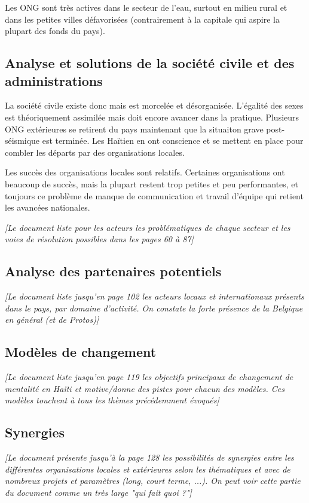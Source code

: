 \documentclass[a4paper, 11pt]{article}
\begin{document}
  Les ONG sont très actives dans le secteur de l'eau, surtout en milieu rural et dans les petites villes défavorisées (contrairement à la capitale qui aspire la plupart des fonds du pays).

  \subsection*{Analyse et solutions de la société civile et des administrations}
  La société civile existe donc mais est morcelée et désorganisée. L'égalité des sexes est théoriquement assimilée mais doit encore avancer dans la pratique. Plusieurs ONG extérieures se retirent du pays maintenant que la situaiton grave post-séismique est terminée. Les Haïtien en ont conscience et se mettent en place pour combler les départs par des organisations locales.

  Les succès des organisations locales sont relatifs. Certaines organisations ont beaucoup de succès, mais la plupart restent trop petites et peu performantes, et toujours ce problème de manque de communication et travail d'équipe qui retient les avancées nationales.

  \textit{[Le document liste pour les acteurs les problématiques de chaque secteur et les voies de résolution possibles dans les pages 60 à 87]}

  \subsection*{Analyse des partenaires potentiels}
  \textit{[Le document liste jusqu'en page 102 les acteurs locaux et internationaux présents dans le pays, par domaine d'activité. On constate la forte présence de la Belgique en général (et de Protos)]}

  \subsection*{Modèles de changement}
  \textit{[Le document liste jusqu'en page 119 les objectifs principaux de changement de mentalité en Haïti et motive/donne des pistes pour chacun des modèles. Ces modèles touchent à tous les thèmes précédemment évoqués]}

  \subsection*{Synergies}
  \textit{[Le document présente jusqu'à la page 128 les possibilités de synergies entre les différentes organisations locales et extérieures selon les thématiques et avec de nombreux projets et paramètres (long, court terme, ...). On peut voir cette partie du document comme un très large "qui fait quoi ?"]}
\end{document}

